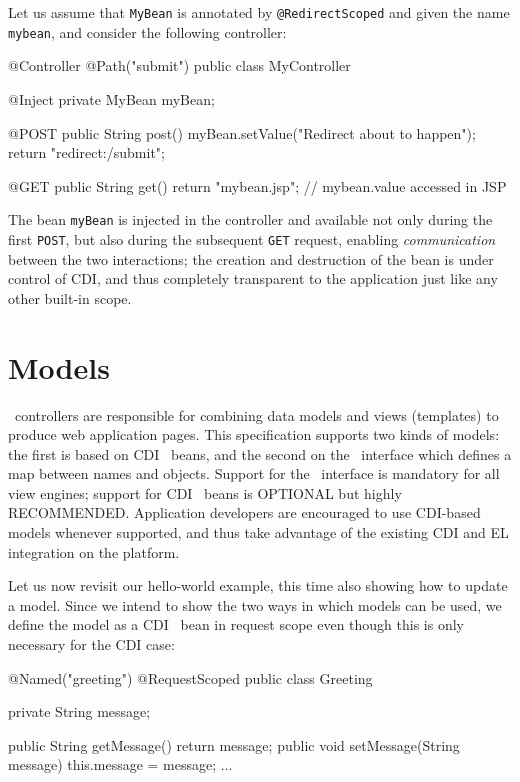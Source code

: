 Let us assume that {\tt MyBean} is annotated by {\tt @RedirectScoped} and given
the name {\tt mybean}, and consider the following controller:

\begin{listing}{1}
@Controller
@Path("submit")
public class MyController {

    @Inject
    private MyBean myBean;
    
    @POST
    public String post() {
        myBean.setValue("Redirect about to happen");
        return "redirect:/submit";
    }

    @GET
    public String get() {
        return "mybean.jsp";    // mybean.value accessed in JSP
    }
}
\end{listing}

The bean {\tt myBean} is injected in the controller and available not only during
the first {\tt POST}, but also during the subsequent {\tt GET} request, enabling
{\em communication} between the two interactions; the creation and destruction
of the bean is under control of CDI, and thus completely transparent to the application
 just like any other built-in scope.

\section{Models}
\label{models}

\mvc\ controllers are responsible for combining data models and views (templates) to 
produce web application pages. This specification supports two kinds of models: the
first is based on CDI \Named\ beans, and the second on the \Models\ interface
which defines a map between names and objects. Support for the \Models\ 
interface is mandatory for all view engines; support for CDI \Named\ beans is
OPTIONAL but highly RECOMMENDED. Application developers are encouraged to use CDI-based
models whenever supported, and thus take advantage of the existing CDI and EL integration
on the platform.

Let us now revisit our hello-world example, this time also showing how to update
a model. Since we intend to show the two ways in which models can be used, we define the
model as a CDI \Named\ bean in request scope even though this is only necessary
for the CDI case:

\begin{listing}{1}
@Named("greeting")
@RequestScoped
public class Greeting {

	private String message;
	
	public String getMessage() { return message; }
	public void setMessage(String message) { this.message = message; }
	...
}
\end{listing}

